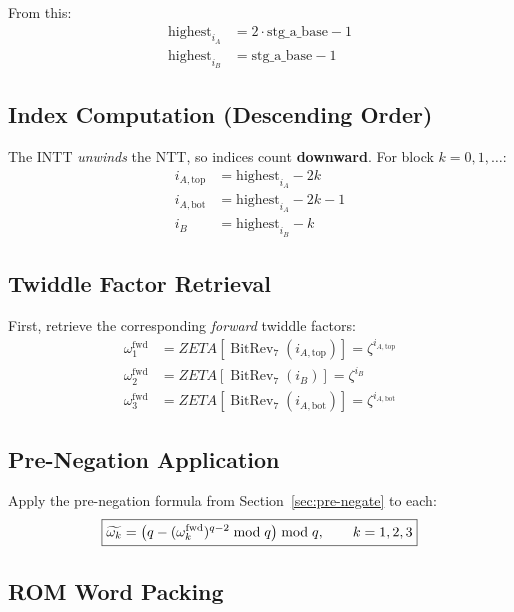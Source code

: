 \documentclass[11pt,a4paper]{article}
\newcommand{\brev}[1]{\operatorname{BitRev}_{7}\!\left(#1\right)}
\newcommand{\modneg}[1]{\widetilde{#1}}
\begin{document}
From this:
\begin{align}
  \text{highest}_{i_A} &= 2 \cdot \text{stg\_a\_base} - 1 \label{eq:highest-iA}\\
  \text{highest}_{i_B} &= \text{stg\_a\_base} - 1 \label{eq:highest-iB}
\end{align}

\subsection{Index Computation (Descending Order)}

The INTT \emph{unwinds} the NTT, so indices count \textbf{downward}. For block $k = 0, 1, \ldots$:
\begin{align}
  i_{A,\text{top}} &= \text{highest}_{i_A} - 2k \label{eq:intt-iA-top}\\
  i_{A,\text{bot}} &= \text{highest}_{i_A} - 2k - 1 \label{eq:intt-iA-bot}\\
  i_B               &= \text{highest}_{i_B} - k \label{eq:intt-iB}
\end{align}

\subsection{Twiddle Factor Retrieval}

First, retrieve the corresponding \emph{forward} twiddle factors:
\begin{align*}
  \omega_1^{\text{fwd}} &= ZETA\!\left[\brev{i_{A,\text{top}}}\right] = \zeta^{i_{A,\text{top}}} \\
  \omega_2^{\text{fwd}} &= ZETA\!\left[\brev{i_B}\right] = \zeta^{i_B} \\
  \omega_3^{\text{fwd}} &= ZETA\!\left[\brev{i_{A,\text{bot}}}\right] = \zeta^{i_{A,\text{bot}}}
\end{align*}

\subsection{Pre-Negation Application}

Apply the pre-negation formula from Section~\ref{sec:pre-negate} to each:
\begin{equation}
  \boxed{%
    \modneg{\omega_k} = \bigl(q - (\omega_k^{\text{fwd}})^{q-2} \bmod q\bigr) \bmod q,
    \qquad k = 1,2,3
  }
  \label{eq:r4intt-vals}
\end{equation}

\subsection{ROM Word Packing}
\end{document}
